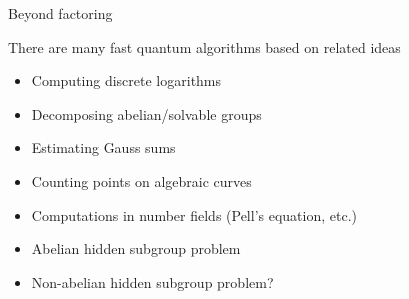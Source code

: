 
\begin{frame}{Beyond factoring}

There are many fast quantum algorithms based on related ideas
\begin{itemize}
  \item Computing discrete logarithms
  \item Decomposing abelian/solvable groups
  \item Estimating Gauss sums
  \item Counting points on algebraic curves
  \item Computations in number fields (Pell's equation, etc.)
  \item Abelian hidden subgroup problem
  \item Non-abelian hidden subgroup problem?
\end{itemize}

\end{frame}